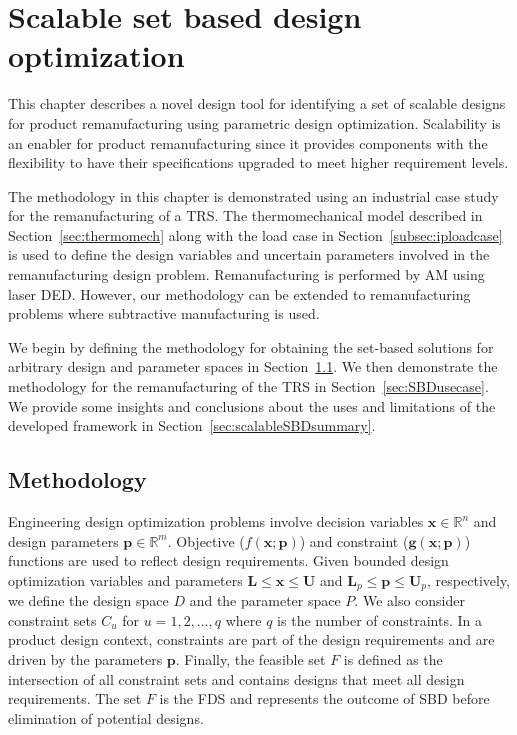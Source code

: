 \chapter{Scalable set based design optimization}
\label{ch:scalableSBD}

This chapter describes a novel design tool for identifying a set of scalable designs for product remanufacturing using parametric design optimization. Scalability is an enabler for product remanufacturing since it provides components with the flexibility to have their specifications upgraded to meet higher requirement levels.

The methodology in this chapter is demonstrated using an industrial case study for the remanufacturing of a \ac{TRS}. The thermomechanical model described in Section~\ref{sec:thermomech} along with the load case in Section~\ref{subsec:iploadcase} is used to define the design variables and uncertain parameters involved in the remanufacturing design problem. Remanufacturing is performed by \ac{AM} using laser \ac{DED}. However, our methodology can be extended to remanufacturing problems where subtractive manufacturing is used.

We begin by defining the methodology for obtaining the set-based solutions for arbitrary design and parameter spaces in Section~\ref{sec:SBDmethods}. We then demonstrate the methodology for the remanufacturing of the \ac{TRS} in Section~\ref{sec:SBDusecase}. We provide some insights and conclusions about the uses and limitations of the developed framework in Section~\ref{sec:scalableSBDsummary}.

\section{Methodology} \label{sec:SBDmethods}

Engineering design optimization problems involve decision variables $\mathbf{x}  \in \mathbb{R}^n$ and design parameters ${\mathbf{p}}  \in \mathbb{R}^m$. Objective (${f}(\mathbf{x};\mathbf{p})$) and constraint ($\mathbf{g}(\mathbf{x};\mathbf{p})$) functions are used to reflect design requirements. Given bounded design optimization variables and parameters $\mathbf{L} \leq \mathbf{x} \leq \mathbf{U}$ and $\mathbf{L}_p \leq \mathbf{p} \leq \mathbf{U}_p$, respectively, we define the design space $\mathit{D}$ and the parameter space $\mathit{P}$. We also consider constraint sets $\mathit{C}_u$ for $u = 1,2,\ldots,q$ where $q$ is the number of constraints. In a product design context, constraints are part of the design requirements and are driven by the parameters $\mathbf{p}$. Finally, the feasible set $\mathit{F}$ is defined as the intersection of all constraint sets and contains designs that meet all design requirements. The set $\mathit{F}$ is the \ac{FDS} and represents the outcome of \ac{SBD} before elimination of potential designs. 

